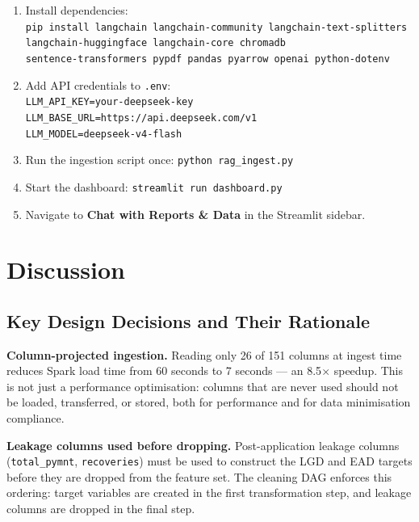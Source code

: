 \documentclass[12pt,a4paper]{report}
\begin{document}
\begin{enumerate}
  \item Install dependencies:\\
    \texttt{pip install langchain langchain-community langchain-text-splitters}\\
    \texttt{\phantom{pip install }langchain-huggingface langchain-core chromadb}\\
    \texttt{\phantom{pip install }sentence-transformers pypdf pandas pyarrow openai python-dotenv}
  \item Add API credentials to \texttt{.env}:\\
    \texttt{LLM\_API\_KEY=your-deepseek-key}\\
    \texttt{LLM\_BASE\_URL=https://api.deepseek.com/v1}\\
    \texttt{LLM\_MODEL=deepseek-v4-flash}
  \item Run the ingestion script once: \texttt{python rag\_ingest.py}
  \item Start the dashboard: \texttt{streamlit run dashboard.py}
  \item Navigate to \textbf{Chat with Reports \& Data} in the Streamlit sidebar.
\end{enumerate}

\chapter{Discussion}
\label{ch:discussion}

\section{Key Design Decisions and Their Rationale}

\textbf{Column-projected ingestion.} Reading only 26 of 151 columns at ingest time reduces Spark load time from 60 seconds to 7 seconds --- an 8.5$\times$ speedup. This is not just a performance optimisation: columns that are never used should not be loaded, transferred, or stored, both for performance and for data minimisation compliance.

\textbf{Leakage columns used before dropping.} Post-application leakage columns (\texttt{total\_pymnt}, \texttt{recoveries}) must be used to construct the LGD and EAD targets before they are dropped from the feature set. The cleaning DAG enforces this ordering: target variables are created in the first transformation step, and leakage columns are dropped in the final step.
\end{document}

